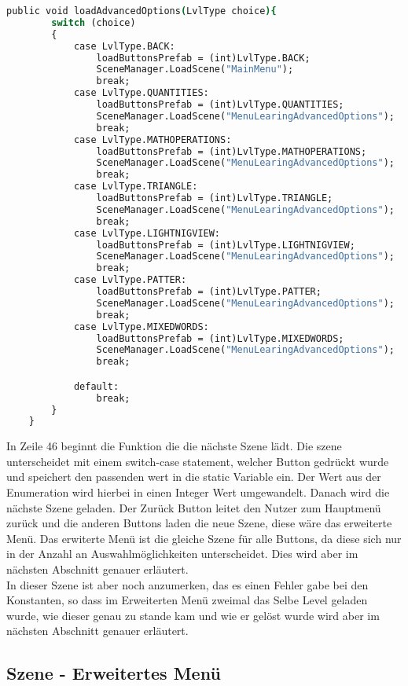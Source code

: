 \begin{lstlisting}[language=csh, caption={MenuPickLevel.cs Klasse Menü loadAdvancedOptions Funktion}]
	public void loadAdvancedOptions(LvlType choice){
		switch (choice)
		{
			case LvlType.BACK:
				loadButtonsPrefab = (int)LvlType.BACK;
				SceneManager.LoadScene("MainMenu");
				break;
			case LvlType.QUANTITIES:
				loadButtonsPrefab = (int)LvlType.QUANTITIES;
				SceneManager.LoadScene("MenuLearingAdvancedOptions");
				break;
			case LvlType.MATHOPERATIONS:
				loadButtonsPrefab = (int)LvlType.MATHOPERATIONS;
				SceneManager.LoadScene("MenuLearingAdvancedOptions");
				break;
			case LvlType.TRIANGLE:
				loadButtonsPrefab = (int)LvlType.TRIANGLE;
				SceneManager.LoadScene("MenuLearingAdvancedOptions");
				break;
			case LvlType.LIGHTNIGVIEW:
				loadButtonsPrefab = (int)LvlType.LIGHTNIGVIEW;
				SceneManager.LoadScene("MenuLearingAdvancedOptions");
				break;
			case LvlType.PATTER:
				loadButtonsPrefab = (int)LvlType.PATTER;
				SceneManager.LoadScene("MenuLearingAdvancedOptions");
				break;
			case LvlType.MIXEDWORDS:
				loadButtonsPrefab = (int)LvlType.MIXEDWORDS;
				SceneManager.LoadScene("MenuLearingAdvancedOptions");
				break;

			default:
				break;
		}
	}
\end{lstlisting}

In Zeile 46 beginnt die Funktion die die nächste Szene lädt. Die szene unterscheidet mit einem switch-case statement, welcher Button gedrückt wurde und speichert den passenden wert in die static Variable ein. Der Wert aus der Enumeration wird hierbei in einen Integer Wert umgewandelt. Danach wird die nächste Szene geladen. Der Zurück Button leitet den Nutzer zum Hauptmenü zurück und die anderen Buttons laden die neue Szene, diese wäre das erweiterte Menü. Das erwiterte Menü ist die gleiche Szene für alle Buttons, da diese sich nur in der Anzahl an Auswahlmöglichkeiten unterscheidet. Dies wird aber im nächsten Abschnitt genauer erläutert.\\
In dieser Szene ist aber noch anzumerken, das es einen Fehler gabe bei den Konstanten, so dass im Erweiterten Menü zweimal das Selbe Level geladen wurde, wie dieser genau zu stande kam und wie er gelöst wurde wird aber im nächsten Abschnitt genauer erläutert.

\subsection{Szene - Erweitertes Menü}
